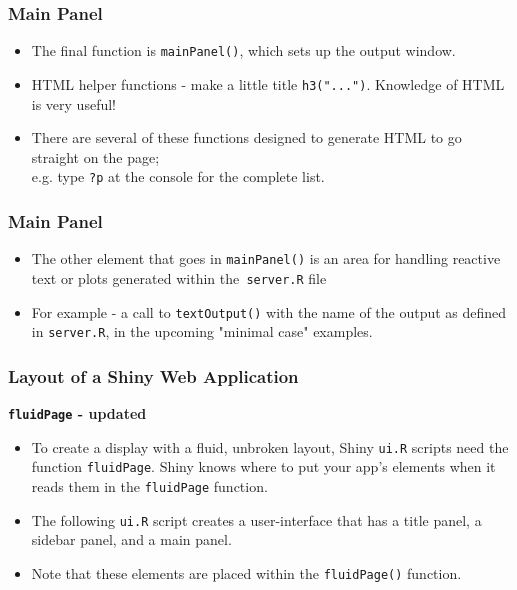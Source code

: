 \documentclass{beamer}
\begin{document}
\begin{frame}
	\frametitle{Main Panel}
	\Large
	\vspace{-1cm}
	\begin{itemize}
		\item The final function is \texttt{mainPanel()}, which sets up the output window. 
		\item  HTML helper functions - make a little title \texttt{h3("...")}. Knowledge of HTML is very useful!
		\item There are several of these functions designed to generate HTML to go straight on
		the page; \\e.g. type \texttt{?p} at the console for the complete list. 
	\end{itemize}
\end{frame}
\begin{frame}
	\Large
	\frametitle{Main Panel}
	\begin{itemize}
		\item The other element that goes in
		\texttt{mainPanel()} is an area for handling reactive text or plots generated within the\texttt{ server.R}
		file
		\item For example - a call to \texttt{textOutput()} with the name of the output as defined in
		\texttt{server.R}, in the upcoming "minimal case" examples.
	\end{itemize}
\end{frame}
\begin{frame}[fragile]	
\frametitle{Layout of a Shiny Web Application}
\Large
\textbf{\texttt{fluidPage} - updated}
\begin{itemize}
	\item To create a display with a fluid, unbroken layout, Shiny \texttt{ui.R} scripts need the function \texttt{fluidPage}. Shiny knows where to put your app’s elements when it reads them in the \texttt{fluidPage} function.
	
	\item The following \texttt{ui.R} script creates a user-interface that has a title panel, a sidebar panel, and a main panel. 
	\item Note that these elements are placed within the \texttt{fluidPage()} function.
\end{itemize}
\end{frame}
\end{document}
